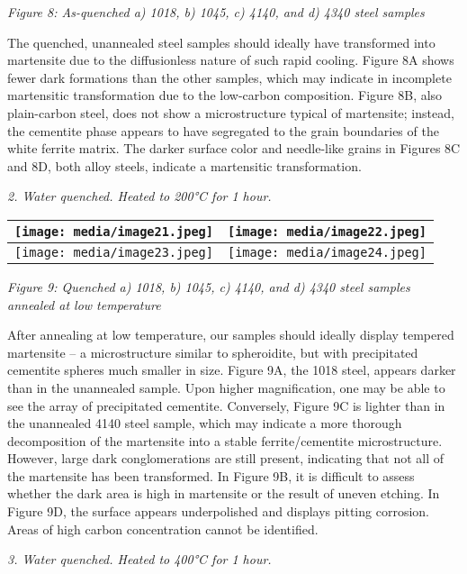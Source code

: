 \documentclass[]{article}
\begin{document}
\emph{Figure 8: As-quenched a) 1018, b) 1045, c) 4140, and d) 4340 steel
samples}

The quenched, unannealed steel samples should ideally have transformed
into martensite due to the diffusionless nature of such rapid cooling.
Figure 8A shows fewer dark formations than the other samples, which may
indicate in incomplete martensitic transformation due to the low-carbon
composition. Figure 8B, also plain-carbon steel, does not show a
microstructure typical of martensite; instead, the cementite phase
appears to have segregated to the grain boundaries of the white ferrite
matrix. The darker surface color and needle-like grains in Figures 8C
and 8D, both alloy steels, indicate a martensitic transformation.

\emph{2. Water quenched. Heated to 200°C for 1 hour.}

\begin{longtable}[]{@{}ll@{}}
\toprule
\texttt{[image: media/image21.jpeg]} &
\texttt{[image: media/image22.jpeg]}\tabularnewline
\midrule
\endhead
\texttt{[image: media/image23.jpeg]} &
\texttt{[image: media/image24.jpeg]}\tabularnewline
\bottomrule
\end{longtable}

\emph{Figure 9: Quenched a) 1018, b) 1045, c) 4140, and d) 4340 steel
samples annealed at low temperature}

After annealing at low temperature, our samples should ideally display
tempered martensite -- a microstructure similar to spheroidite, but with
precipitated cementite spheres much smaller in size. Figure 9A, the 1018
steel, appears darker than in the unannealed sample. Upon higher
magnification, one may be able to see the array of precipitated
cementite. Conversely, Figure 9C is lighter than in the unannealed 4140
steel sample, which may indicate a more thorough decomposition of the
martensite into a stable ferrite/cementite microstructure. However,
large dark conglomerations are still present, indicating that not all of
the martensite has been transformed. In Figure 9B, it is difficult to
assess whether the dark area is high in martensite or the result of
uneven etching. In Figure 9D, the surface appears underpolished and
displays pitting corrosion. Areas of high carbon concentration cannot be
identified.

\emph{3. Water quenched. Heated to 400°C for 1 hour.}
\end{document}
